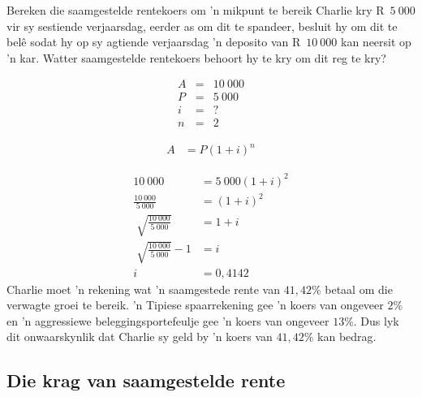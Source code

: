 \begin{wex}{Bereken die saamgestelde rentekoers om 'n mikpunt te bereik}
{Charlie kry R~$5~000$ vir sy sestiende verjaarsdag, eerder as om dit te spandeer, besluit hy om dit te bel\^e sodat hy op sy agtiende verjaarsdag 'n deposito van R~$10~000$ kan neersit op 'n kar. Watter saamgestelde rentekoers behoort hy te kry om dit reg te kry?}
{
    \begin{eqnarray*}
	A &=& 10~000\\
	P &=& 5~000\\
	i &=& ?\\
	n &=& 2
    \end{eqnarray*}

    \begin{align*}
	A &= P(1 + i)^n
    \end{align*}

    \begin{align*}
	10~000 &= 5~000(1 + i)^2\\
	\frac{10~000}{5~000}&= (1 +i)^2\\
	\sqrt[]{\frac{10~000}{5~000}} &= 1 + i\\
	\sqrt[]{\frac{10~000}{5~000}} - 1 &= i\\
	i &= 0,4142
    \end{align*}
Charlie moet 'n rekening wat 'n saamgestede rente van $41,42\%$ betaal om die  verwagte groei te bereik. 'n Tipiese spaarrekening gee 'n koers van ongeveer $2\%$ en 'n aggressiewe beleggingsportefeulje gee 'n koers van ongeveer $13\%$. Dus lyk dit onwaarskynlik dat Charlie sy geld by 'n koers van $41,42\%$ kan bedrag.
% 
} 
\end{wex}


\subsection{Die krag van saamgestelde rente}

